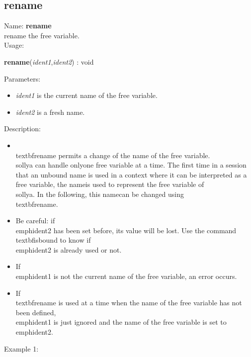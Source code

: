 \subsection{rename}
\label{labrename}
\noindent Name: \textbf{rename}\\
rename the free variable.\\
\noindent Usage: 
\begin{center}
\textbf{rename}(\emph{ident1},\emph{ident2}) : \textsf{void}\\
\end{center}
Parameters: 
\begin{itemize}
\item \emph{ident1} is the current name of the free variable.
\item \emph{ident2} is a fresh name.
\end{itemize}
\noindent Description: \begin{itemize}

\item \\textbf{rename} permits a change of the name of the free variable. \\sollya can handle only\n   one free variable at a time. The first time in a session that an unbound name \n   is used in a context where it can be interpreted as a free variable, the name\n   is used to represent the free variable of \\sollya. In the following, this name\n   can be changed using \\textbf{rename}.\n
\item Be careful: if \\emph{ident2} has been set before, its value will be lost. Use the \n   command \\textbf{isbound} to know if \\emph{ident2} is already used or not.\n
\item If \\emph{ident1} is not the current name of the free variable, an error occurs.\n
\item If \\textbf{rename} is used at a time when the name of the free variable has not been \n   defined, \\emph{ident1} is just ignored and the name of the free variable is \n   set to \\emph{ident2}.\n\end{itemize}
\noindent Example 1: 
\begin{center}\begin{minipage}{15cm}\begin{Verbatim}[frame=single]
\end{Verbatim}
\end{minipage}\end{center}

